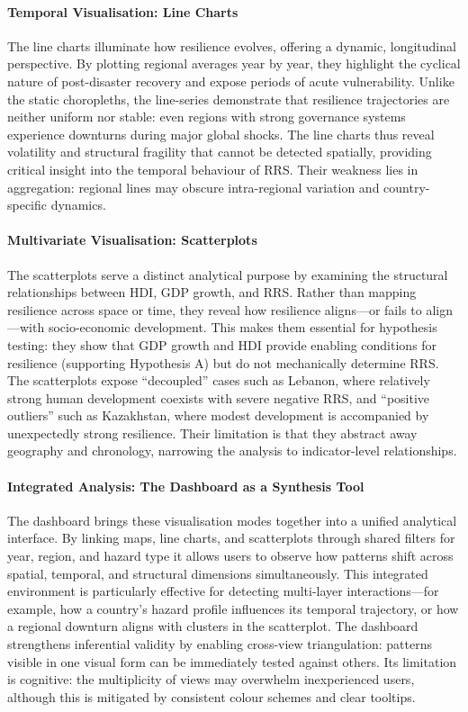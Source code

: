 \documentclass[conference]{IEEEtran}
\begin{document}
\paragraph{Temporal Visualisation: Line Charts}
The line charts illuminate how resilience evolves, offering a dynamic, longitudinal perspective. By plotting regional averages year by year, they highlight the cyclical nature of post-disaster recovery and expose periods of acute vulnerability. Unlike the static choropleths, the line-series demonstrate that resilience trajectories are neither uniform nor stable: even regions with strong governance systems experience downturns during major global shocks. The line charts thus reveal volatility and structural fragility that cannot be detected spatially, providing critical insight into the temporal behaviour of RRS. Their weakness lies in aggregation: regional lines may obscure intra-regional variation and country-specific dynamics.

\paragraph{Multivariate Visualisation: Scatterplots}
The scatterplots serve a distinct analytical purpose by examining the structural relationships between HDI, GDP growth, and RRS. Rather than mapping resilience across space or time, they reveal how resilience aligns—or fails to align—with socio-economic development. This makes them essential for hypothesis testing: they show that GDP growth and HDI provide enabling conditions for resilience (supporting Hypothesis A) but do not mechanically determine RRS. The scatterplots expose “decoupled” cases such as Lebanon, where relatively strong human development coexists with severe negative RRS, and “positive outliers” such as Kazakhstan, where modest development is accompanied by unexpectedly strong resilience. Their limitation is that they abstract away geography and chronology, narrowing the analysis to indicator-level relationships.

\paragraph{Integrated Analysis: The Dashboard as a Synthesis Tool}
The dashboard brings these visualisation modes together into a unified analytical interface. By linking maps, line charts, and scatterplots through shared filters for year, region, and hazard type it allows users to observe how patterns shift across spatial, temporal, and structural dimensions simultaneously. This integrated environment is particularly effective for detecting multi-layer interactions—for example, how a country’s hazard profile influences its temporal trajectory, or how a regional downturn aligns with clusters in the scatterplot. The dashboard strengthens inferential validity by enabling cross-view triangulation: patterns visible in one visual form can be immediately tested against others. Its limitation is cognitive: the multiplicity of views may overwhelm inexperienced users, although this is mitigated by consistent colour schemes and clear tooltips.
\end{document}
